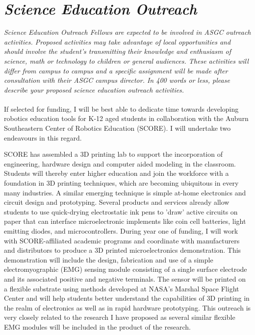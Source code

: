 \documentclass{article}
\begin{document}
\section{\emph{Science Education Outreach}} 

\small{\emph{Science Education Outreach	Fellows are expected to be involved in ASGC outreach activities. Proposed activities may take advantage of local opportunities and should involve the student's transmitting their knowledge and enthusiasm of science, math or technology to children or general audiences. These activities will differ from campus to campus and a specific assignment will be made after consultation with their ASGC campus director. In 400 words or less, please describe your proposed science education outreach activities.}}
\\
\\
\large
If selected for funding, I will be best able to dedicate time towards developing robotics education tools for K-12 aged students in collaboration with the Auburn Southeastern Center of Robotics Education (SCORE). I will undertake two endeavours in this regard.

SCORE has assembled a 3D printing lab to support the incorporation of engineering, hardware design and computer aided modeling in the classroom. Students will thereby enter higher education and join the workforce with a foundation in 3D printing techniques, which are becoming ubiquitous in every many industries. A similar emerging technique is simple at-home electronics and circuit design and prototyping. Several products and services already allow students to use quick-drying electrostatic ink pens to 'draw' active circuits on paper that can interface microelectronic implements like coin cell batteries, light emitting diodes, and microcontrollers. During year one of funding, I will work with SCORE-affiliated academic programs and coordinate with manufacturers and distributors to produce a 3D printed microelectronics demonstration. This demonstration will include the design, fabrication and use of a simple electromyographic (EMG) sensing module consisting of a single surface electrode and its associated positive and negative terminals. The sensor will be printed on a flexible substrate using methods developed at NASA's Marshal Space Flight Center and will help students better understand the capabilities of 3D printing in the realm of electronics as well as in rapid hardware prototyping. This outreach is very closely related to the research I have proposed as several similar flexible EMG modules will be included in the product of the research. 
\end{document}
